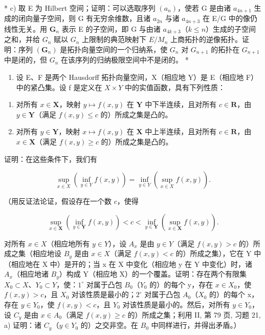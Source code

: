 * c) 取 E 为 Hilbert 空间；证明：可以选取序列 \((a_{n})\)，使若 G 是由诸 \(a_{4n + 1}\) 生成的闭向量子空间，则 G 有无穷余维数，且诸 \(a_{2n}\) 与诸 \(a_{4n + 3}\) 在 E/G 中的像仍线性无关。用 \(\mathbf{G}_n\) 表示 E 的子空间，即 G 与由诸 \(a_{4k + 3}\)（\(k\leqslant n\)）生成的子空间之和，并给 \(G_{n}\) 赋以 \(G_{n}\) 上限制的典范映射下 \(E/M_{n}\) 上商拓扑的逆像拓扑。证明：序列 \((\mathbf{G}_{n})\) 是拓扑向量空间的一个归纳系，使 \(G_{n}\) 对 \(G_{n+1}\) 的拓扑在 \(G_{n+1}\) 中是闭的，但 \(G_{n}\) 在该序列的归纳极限空间中不是闭的。 *

\begin{enumerate}
\def\labelenumi{\arabic{enumi})}
\setcounter{enumi}{26}
\tightlist
\item
  设 E、F 是两个 Hausdorff 拓扑向量空间，X（相应地 Y）是 E（相应地 F）中的紧凸集。设 f 是定义在 \(X \times Y\) 中的实值函数，具有下列性质：
\end{enumerate}

\begin{enumerate}
\def\labelenumi{(\roman{enumi})}
\item
  对所有 \(x \in \mathbf{X}\)，映射 \(y \mapsto f(x, y)\) 在 \(\mathbf{Y}\) 中下半连续，且对所有 \(c \in \mathbf{R}\)，由 \(y \in \mathbf{Y}\)（满足 \(f(x, y) \leqslant c\) 的）所成之集是凸的。
\item
  对所有 \(y \in \mathbf{Y}\)，映射 \(x \mapsto f(x, y)\) 在 \(\mathbf{X}\) 中上半连续，且对所有 \(c \in \mathbf{R}\)，由 \(x \in \mathbf{X}\)（满足 \(f(x, y) \geqslant c\) 的）所成之集是凸的。
\end{enumerate}

证明：在这些条件下，我们有

\[
\sup _ {x \in X} (\inf _ {y \in Y} f (x, y)) = \inf _ {y \in Y} (\sup _ {x \in X} f (x, y)).
\]

（用反证法论证，假设存在一个数 \(c\)，使得

\[
\sup _ {x \in \mathbf {X}} (\inf _ {y \in \mathbf {Y}} f (x, y)) <   c <   \inf _ {y \in \mathbf {Y}} (\sup _ {x \in \mathbf {X}} f (x, y)).
\]

对所有 \(x \in X\)（相应地所有 \(y \in Y\)），设 \(A_{x}\) 是由 \(y \in Y\)（满足 \(f(x, y) > c\) 的）所成之集（相应地设 \(B_{y}\) 是由 \(x \in X\)（满足 \(f(x, y) < c\) 的）所成之集），它在 Y 中（相应地在 X 中）是开的；当 x 在 X 中变化（相应地 y 在 Y 中变化）时，诸 \(A_{x}\)（相应地诸 \(B_{y}\)）构成 Y（相应地 X）的一个覆盖。证明：存在两个有限集 \(X_{0} \subset X\)、\(Y_{0} \subset Y\)，使：\(1^{\circ}\) 对属于凸包 \(B_{0}\)（\(Y_{0}\) 的）的每个 y，存在 \(x \in X_{0}\)，使 \(f(x, y) > c\)，且 \(X_{0}\) 对该性质是最小的；\(2^{\circ}\) 对属于凸包 \(A_{0}\)（\(X_{0}\) 的）的每个 x，存在 \(y \in Y_{0}\)，使 \(f(x, y) < c\)，且 \(Y_{0}\) 对该性质是最小的。然后，对所有 \(y \in Y_{0}\)，设 \(C_{y}\) 是由 \(x \in A_{0}\)（满足 \(f(x, y) \geqslant c\) 的）所成之集；利用 II, 第 79 页, 习题 21, a) 证明：诸 \(C_{y}\)（\(y \in Y_{0}\) 的）之交非空。在 \(B_{0}\) 中同样进行，并得出矛盾。）

